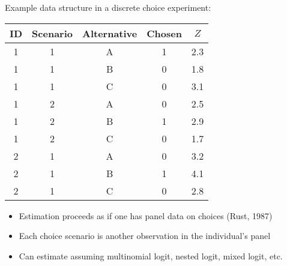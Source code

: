 \documentclass[aspectratio=169]{beamer}
\begin{document}
\begin{frame}

Example data structure in a discrete choice experiment:

\bigskip{}

\begin{table}
\centering
\begin{tabular}{ccccc}
\toprule
ID & Scenario & Alternative & Chosen & $Z$ \\
\midrule
1 & 1 & A & 1 & 2.3 \\
1 & 1 & B & 0 & 1.8 \\
1 & 1 & C & 0 & 3.1 \\ \midrule
1 & 2 & A & 0 & 2.5 \\
1 & 2 & B & 1 & 2.9 \\
1 & 2 & C & 0 & 1.7 \\ \midrule
2 & 1 & A & 0 & 3.2 \\
2 & 1 & B & 1 & 4.1 \\
2 & 1 & C & 0 & 2.8 \\
\bottomrule
\end{tabular}
\end{table}

\bigskip{}


\end{frame}




\begin{frame}

\begin{itemize}
\itemsep1.5em
\item<1-> Estimation proceeds as if one has panel data on choices (Rust, 1987)
\item<2-> Each choice scenario is another observation in the individual's panel
\item<3-> Can estimate assuming multinomial logit, nested logit, mixed logit, etc.
\end{itemize}

\end{frame}
\end{document}
